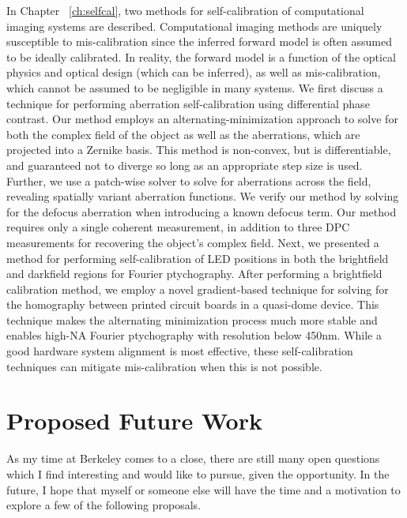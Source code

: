 In Chapter ~\ref{ch:selfcal}, two methods for self-calibration of computational imaging systems are described. Computational imaging methods are uniquely susceptible to mis-calibration since the inferred forward model is often assumed to be ideally calibrated. In reality, the forward model is a function of the optical physics and optical design (which can be inferred), as well as mis-calibration, which cannot be assumed to be negligible in many systems. We first discuss a technique for performing aberration self-calibration using differential phase contrast. Our method employs an alternating-minimization approach to solve for both the complex field of the object as well as the aberrations, which are projected into a Zernike basis. This method is non-convex, but is differentiable, and guaranteed not to diverge so long as an appropriate step size is used. Further, we use a patch-wise solver to solve for aberrations across the field, revealing spatially variant aberration functions. We verify our method by solving for the defocus aberration when introducing a known defocus term. Our method requires only a single coherent measurement, in addition to three DPC measurements for recovering the object's complex field. Next, we presented a method for performing self-calibration of LED positions in both the brightfield and darkfield regions for Fourier ptychography. After performing a brightfield calibration method, we employ a novel gradient-based technique for solving for the homography between printed circuit boards in a quasi-dome device. This technique makes the alternating minimization process much more stable and enables high-NA Fourier ptychography with resolution below 450nm. While a good hardware system alignment is most effective, these self-calibration techniques can mitigate mis-calibration when this is not possible.
\clearpage
\section{Proposed Future Work}
As my time at Berkeley comes to a close, there are still many open questions which I find interesting and would like to pursue, given the opportunity. In the future, I hope that myself or someone else will have the time and a motivation to explore a few of the following proposals.

